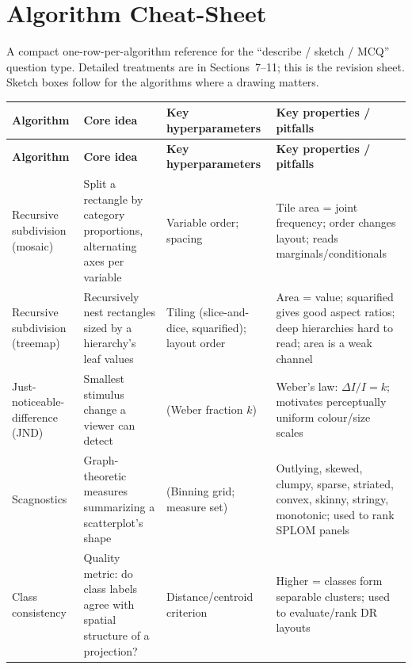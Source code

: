 \section{Algorithm Cheat-Sheet}
\label{sec:algocheat}

A compact one-row-per-algorithm reference for the ``describe / sketch / MCQ''
question type. Detailed treatments are in Sections~7--11; this is the revision
sheet. Sketch boxes follow for the algorithms where a drawing matters.

\renewcommand{\arraystretch}{1.25}
\begin{longtable}{@{}>{\raggedright\arraybackslash}p{2.5cm}
                     >{\raggedright\arraybackslash}p{4.3cm}
                     >{\raggedright\arraybackslash}p{3.6cm}
                     >{\raggedright\arraybackslash}p{4.6cm}@{}}
\toprule
\textbf{Algorithm} & \textbf{Core idea} & \textbf{Key hyperparameters} &
\textbf{Key properties / pitfalls}\\
\midrule
\endfirsthead
\toprule
\textbf{Algorithm} & \textbf{Core idea} & \textbf{Key hyperparameters} &
\textbf{Key properties / pitfalls}\\
\midrule
\endhead
\bottomrule
\endfoot

Recursive subdivision (mosaic) & Split a rectangle by category proportions,
alternating axes per variable & Variable order; spacing & Tile area = joint
frequency; order changes layout; reads marginals/conditionals\\

Recursive subdivision (treemap) & Recursively nest rectangles sized by a
hierarchy's leaf values & Tiling (slice-and-dice, squarified); layout order &
Area = value; squarified gives good aspect ratios; deep hierarchies hard to
read; area is a weak channel\\

Just-noticeable-difference (JND) & Smallest stimulus change a viewer can
detect & (Weber fraction $k$) & Weber's law: $\Delta I / I = k$; motivates
perceptually uniform colour/size scales\\

Scagnostics & Graph-theoretic measures summarizing a scatterplot's shape &
(Binning grid; measure set) & Outlying, skewed, clumpy, sparse, striated,
convex, skinny, stringy, monotonic; used to rank SPLOM panels\\

Class consistency & Quality metric: do class labels agree with spatial
structure of a projection? & Distance/centroid criterion & Higher = classes
form separable clusters; used to evaluate/rank DR layouts\\


\end{longtable}
